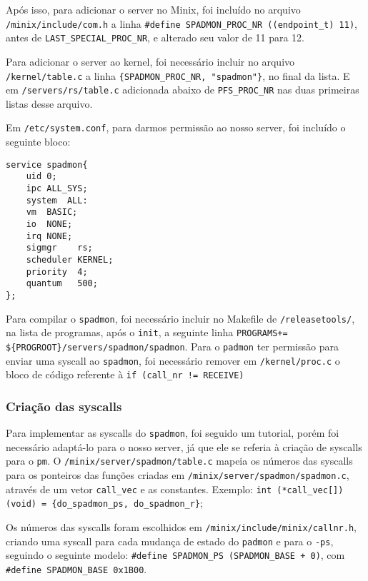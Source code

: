 \documentclass[12pt,journal,compsoc]{IEEEtran}
\begin{document}
Após isso, para adicionar o server no Minix, foi incluído no arquivo \texttt{/minix/include/com.h} a linha \texttt{\#define SPADMON\_PROC\_NR ((endpoint\_t) 11)}, antes de \texttt{LAST\_SPECIAL\_PROC\_NR}, e alterado seu valor de 11 para 12.

Para adicionar o server ao kernel, foi necessário incluir no arquivo \texttt{/kernel/table.c} a linha \texttt{\{SPADMON\_PROC\_NR, "spadmon"\}}, no final da lista. E em \texttt{/servers/rs/table.c} adicionada abaixo de \texttt{PFS\_PROC\_NR} nas duas primeiras listas desse arquivo.

Em \texttt{/etc/system.conf}, para darmos permissão ao nosso server, foi incluído o seguinte bloco:

\begin{verbatim}
service spadmon{
    uid 0;
    ipc ALL_SYS;
    system  ALL:
    vm  BASIC;
    io  NONE;
    irq NONE;
    sigmgr    rs;
    scheduler KERNEL;
    priority  4;
    quantum   500;
};
\end{verbatim}

Para compilar o \texttt{spadmon}, foi necessário incluir no Makefile de \texttt{/releasetools/}, na lista de programas, após o \texttt{init}, a seguinte linha \texttt{PROGRAMS+= \$\{PROGROOT\}/servers/spadmon/spadmon}.
Para o \texttt{padmon} ter permissão para enviar uma syscall ao \texttt{spadmon}, foi necessário remover em \texttt{/kernel/proc.c} o bloco de código referente à \texttt{if (call\_nr != RECEIVE)}

\subsubsection{Criação das syscalls}

Para implementar as syscalls do \texttt{spadmon}, foi seguido um tutorial\cite{implementar_syscall:exercicio}, porém foi necessário adaptá-lo para o nosso server, já que ele se referia à criação de syscalls para o \texttt{pm}. O \texttt{/minix/server/spadmon/table.c} mapeia os números das syscalls para os ponteiros das funções criadas em \texttt{/minix/server/spadmon/spadmon.c}, através de um vetor \texttt{call\_vec} e as constantes. Exemplo: \texttt{int (*call\_vec[])(void) = \{do\_spadmon\_ps, do\_spadmon\_r\}};

Os números das syscalls foram escolhidos em \texttt{/minix/include/minix/callnr.h}, criando uma syscall para cada mudança de estado do \texttt{padmon} e para o \texttt{-ps}, seguindo o seguinte modelo: \texttt{\#define SPADMON\_PS (SPADMON\_BASE + 0)}, com \texttt{\#define SPADMON\_BASE 0x1B00}.
\end{document}
